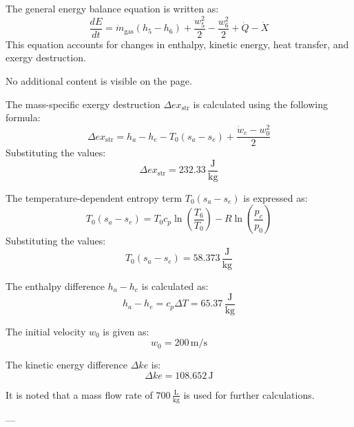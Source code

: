 The general energy balance equation is written as:  
\[
\frac{dE}{dt} = \dot{m}_{\text{gas}} (h_5 - h_6) + \frac{w_5^2}{2} - \frac{w_6^2}{2} + \dot{Q} - \dot{X}
\]  
This equation accounts for changes in enthalpy, kinetic energy, heat transfer, and exergy destruction.  

No additional content is visible on the page.

The mass-specific exergy destruction \( \Delta ex_{\text{str}} \) is calculated using the following formula:  
\[
\Delta ex_{\text{str}} = h_a - h_e - T_0 (s_a - s_e) + \frac{\dot{w}_e - w_0^2}{2}
\]  
Substituting the values:  
\[
\Delta ex_{\text{str}} = 232.33 \, \frac{\text{J}}{\text{kg}}
\]  

The temperature-dependent entropy term \( T_0(s_a - s_e) \) is expressed as:  
\[
T_0(s_a - s_e) = T_0 c_p \ln \left( \frac{T_6}{T_0} \right) - R \ln \left( \frac{p_c}{p_0} \right)
\]  
Substituting the values:  
\[
T_0(s_a - s_e) = 58.373 \, \frac{\text{J}}{\text{kg}}
\]  

The enthalpy difference \( h_a - h_e \) is calculated as:  
\[
h_a - h_e = c_p \Delta T = 65.37 \, \frac{\text{J}}{\text{kg}}
\]  

The initial velocity \( w_0 \) is given as:  
\[
w_0 = 200 \, \text{m/s}
\]  

The kinetic energy difference \( \Delta ke \) is:  
\[
\Delta ke = 108.652 \, \text{J}
\]  

It is noted that a mass flow rate of \( 700 \, \frac{\text{L}}{\text{kg}} \) is used for further calculations.

---